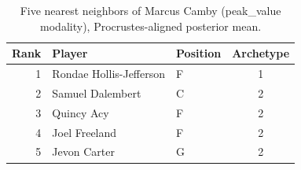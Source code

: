 \begin{table}[htbp]
  \centering\small
  \begin{tabular}{rllc}
    \toprule
    Rank & Player & Position & Archetype \\
    \midrule
    1 & Rondae Hollis-Jefferson & F & 1 \\
    2 & Samuel Dalembert & C & 2 \\
    3 & Quincy Acy & F & 2 \\
    4 & Joel Freeland & F & 2 \\
    5 & Jevon Carter & G & 2 \\
    \bottomrule
  \end{tabular}
  \caption{Five nearest neighbors of Marcus Camby (peak_value modality), Procrustes-aligned posterior mean.}
  \label{tab:Marcus_Camby_neighbors_peak_value}
\end{table}

